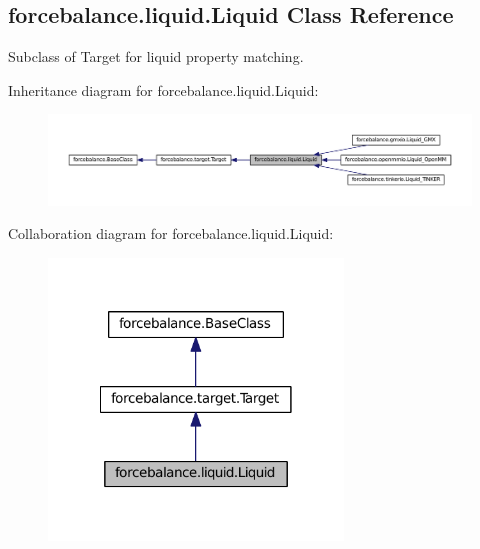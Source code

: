 \hypertarget{classforcebalance_1_1liquid_1_1Liquid}{\subsection{forcebalance.\-liquid.\-Liquid \-Class \-Reference}
\label{classforcebalance_1_1liquid_1_1Liquid}
}


\-Subclass of \-Target for liquid property matching.  




\-Inheritance diagram for forcebalance.\-liquid.\-Liquid\-:
\nopagebreak
\begin{figure}[H]
\begin{center}
\leavevmode
\includegraphics[width=350pt]{classforcebalance_1_1liquid_1_1Liquid__inherit__graph}
\end{center}
\end{figure}


\-Collaboration diagram for forcebalance.\-liquid.\-Liquid\-:
\nopagebreak
\begin{figure}[H]
\begin{center}
\leavevmode
\includegraphics[width=222pt]{classforcebalance_1_1liquid_1_1Liquid__coll__graph}
\end{center}
\end{figure}
